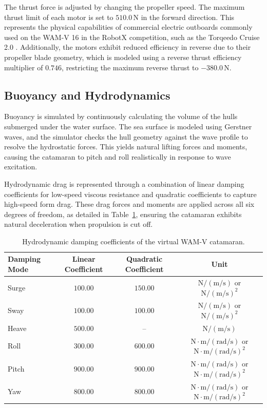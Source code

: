     The thrust force is adjusted by changing the propeller speed. The maximum thrust limit of each motor is set to $510.0\,\text{N}$ in the forward direction. This represents the physical capabilities of commercial electric outboards commonly used on the WAM-V 16 in the RobotX competition, such as the Torqeedo Cruise 2.0 \cite{torqeedo_cruise_manual}. Additionally, the motors exhibit reduced efficiency in reverse due to their propeller blade geometry, which is modeled using a reverse thrust efficiency multiplier of $0.746$, restricting the maximum reverse thrust to $-380.0\,\text{N}$. 

    \subsection{Buoyancy and Hydrodynamics}
    Buoyancy is simulated by continuously calculating the volume of the hulls submerged under the water surface. The sea surface is modeled using Gerstner waves, and the simulator checks the hull geometry against the wave profile to resolve the hydrostatic forces. This yields natural lifting forces and moments, causing the catamaran to pitch and roll realistically in response to wave excitation.

    Hydrodynamic drag is represented through a combination of linear damping coefficients for low-speed viscous resistance and quadratic coefficients to capture high-speed form drag. These drag forces and moments are applied across all six degrees of freedom, as detailed in Table~\ref{tab:usv_damping_parameters}, ensuring the catamaran exhibits natural deceleration when propulsion is cut off.

    \begin{table}[H]
        \centering
        \caption{Hydrodynamic damping coefficients of the virtual WAM-V catamaran.}
        \label{tab:usv_damping_parameters}
        \begin{tabular}{lccc}
            \toprule
            \textbf{Damping Mode} & \textbf{Linear Coefficient} & \textbf{Quadratic Coefficient} & \textbf{Unit} \\
            \midrule
            Surge & $100.00$ & $150.00$ & $\text{N}/(\text{m/s})$ or $\text{N}/(\text{m/s})^2$ \\
            Sway & $100.00$ & $100.00$ & $\text{N}/(\text{m/s})$ or $\text{N}/(\text{m/s})^2$ \\
            Heave & $500.00$ & -- & $\text{N}/(\text{m/s})$ \\
            Roll & $300.00$ & $600.00$ & $\text{N}\cdot\text{m}/(\text{rad/s})$ or $\text{N}\cdot\text{m}/(\text{rad/s})^2$ \\
            Pitch & $900.00$ & $900.00$ & $\text{N}\cdot\text{m}/(\text{rad/s})$ or $\text{N}\cdot\text{m}/(\text{rad/s})^2$ \\
            Yaw & $800.00$ & $800.00$ & $\text{N}\cdot\text{m}/(\text{rad/s})$ or $\text{N}\cdot\text{m}/(\text{rad/s})^2$ \\
            \bottomrule
        \end{tabular}
    \end{table}

